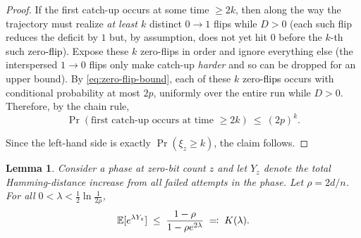 \documentclass[lettersize,journal]{IEEEtran}
\newcommand{\new}[1]{\textcolor{black}{#1}}
\newcommand{\rerev}[1]{\textcolor{purple}{#1}}
\newcommand{\EE}{\mathbb{E}}
\newtheorem{lemma}{Lemma}
\begin{document}
{\begin{proof}
	\smallskip
	If the first catch-up occurs at some time $\ge 2k$, then along the way the trajectory must realize \emph{at least $k$} distinct $0\!\to 1$ flips while $D>0$ (each such flip reduces the deficit by $1$ but, by assumption, does not yet hit $0$ before the $k$-th such zero\new{-flip}). Expose these $k$ zero-flips in order and ignore everything else (the interspersed $1\!\to 0$ flips only make catch-up \emph{harder} and so can be dropped for an upper bound). By \rerev{\eqref{eq:zero-flip-bound}}, each of these $k$ zero\new{-flips} occurs with conditional probability at most $2p$, uniformly over the entire run while $D>0$. Therefore, by the chain rule,
	\[
	\Pr(\text{first catch-up occurs at time }\ge 2k)\ \le\ (2p)^k.
	\]
	
	
	Since the left-hand side is exactly $\Pr(\xi_z\ge k)$, the claim follows.
\end{proof}


\setcounter{lemma}{5}
\begin{lemma}%
	Consider a phase at zero-bit count $z$ and let $Y_z$ denote the total 
	Hamming-distance increase from all failed attempts in the phase.  
	Let $\rho = 2d/n$.  
	For all $0<\lambda<\tfrac12\ln\frac{1}{2\rho}$,
	\[
	\EE[e^{\lambda Y_z}] 
	\;\le\; 
	\textcolor{black}{\frac{1-\rho}{1-\rho e^{2\lambda}}
	\;\eqqcolon\; K(\lambda).}
	\]
\end{lemma}

}
\end{document}

